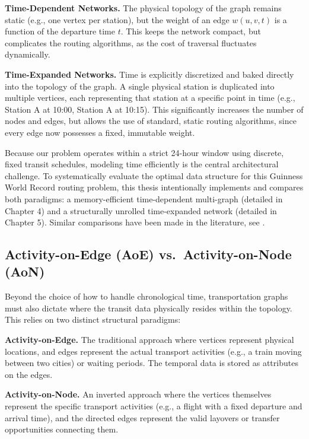\medskip

\textbf{Time-Dependent Networks.}
The physical topology of the graph remains static (e.g., one vertex per station), but the weight of an edge $w(u, v, t)$ is a function of the departure time $t$. This keeps the network compact, but complicates the routing algorithms, as the cost of traversal fluctuates dynamically.

\textbf{Time-Expanded Networks.}
Time is explicitly discretized and baked directly into the topology of the graph. A single physical station is duplicated into multiple vertices, each representing that station at a specific point in time (e.g., Station A at 10:00, Station A at 10:15). This significantly increases the number of nodes and edges, but allows the use of standard, static routing algorithms, since every edge now possesses a fixed, immutable weight.

\medskip

Because our problem operates within a strict 24-hour window using discrete, fixed transit schedules, modeling time efficiently is the central architectural challenge. To systematically evaluate the optimal data structure for this Guinness World Record routing problem, this thesis intentionally implements and compares both paradigms: a memory-efficient time-dependent multi-graph (detailed in Chapter 4) and a structurally unrolled time-expanded network (detailed in Chapter 5). Similar comparisons have been made in the literature, see \cite{pyrga2007efficient}.

\subsection{Activity-on-Edge (AoE) vs.\ Activity-on-Node (AoN)}
\label{subsec:aoe_aon}

Beyond the choice of how to handle chronological time, transportation graphs must also dictate where the transit data physically resides within the topology. This relies on two distinct structural paradigms:

\medskip

\textbf{Activity-on-Edge.}
The traditional approach where vertices represent physical locations, and edges represent the actual transport activities (e.g., a train moving between two cities) or waiting periods. The temporal data is stored as attributes on the edges.

\textbf{Activity-on-Node.}
An inverted approach where the vertices themselves represent the specific transport activities (e.g., a flight with a fixed departure and arrival time), and the directed edges represent the valid layovers or transfer opportunities connecting them.

